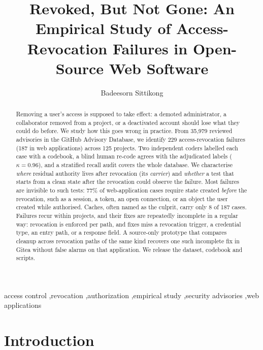 \documentclass[preprint,12pt]{elsarticle}
\begin{document}
\begin{frontmatter}

\title{Revoked, But Not Gone: An Empirical Study of Access-Revocation Failures in Open-Source Web Software}

\author{Badeesorn Sittikong}
\address{King Mongkut's University of Technology Thonburi (KMUTT), Bangkok, Thailand}

\begin{abstract}
Removing a user's access is supposed to take effect: a demoted administrator, a collaborator removed
from a project, or a deactivated account should lose what they could do before. We study how this goes
wrong in practice. From 35{,}979 reviewed advisories in the GitHub Advisory Database, we identify 229
access-revocation failures (187 in web applications) across 125 projects. Two independent coders labelled
each case with a codebook, a blind human re-code agrees with the adjudicated labels ($\kappa=0.96$), and a
stratified recall audit covers the whole database. We characterise
\emph{where} residual authority lives after revocation (its \emph{carrier}) and \emph{whether} a
test that starts from a clean state after the revocation could observe the failure. Most failures are
invisible to such tests: 77\% of web-application cases require state created \emph{before} the
revocation, such as a session, a token, an open connection, or an object the user created while authorised. Caches,
often named as the culprit, carry only 8 of 187 cases. Failures recur within projects, and their fixes
are repeatedly incomplete in a regular way: revocation is enforced per path, and fixes miss a revocation
trigger, a credential type, an entry path, or a response field. A source-only prototype that compares
cleanup across revocation paths of the same kind recovers one such incomplete fix in Gitea without
false alarms on that application. We release the dataset, codebook and scripts.
\end{abstract}

\begin{keyword}
access control \sep revocation \sep authorization \sep empirical study \sep security advisories \sep web applications
\end{keyword}
\end{frontmatter}

\section{Introduction}
\end{document}
